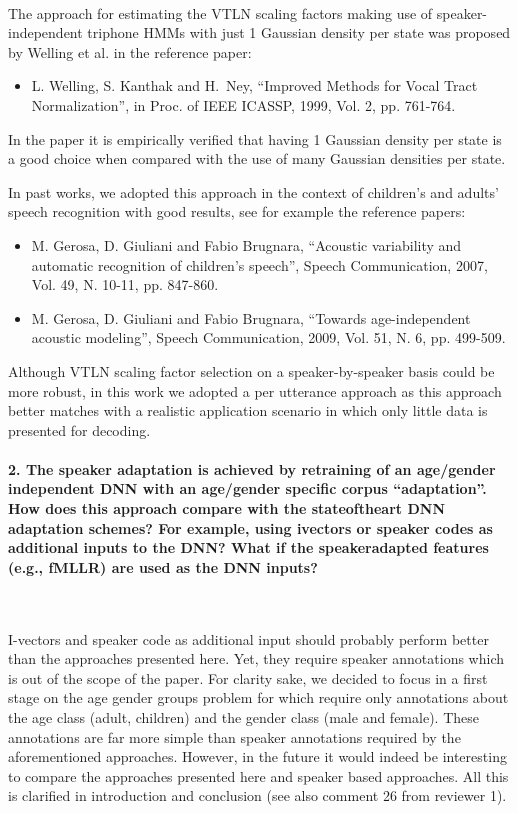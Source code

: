 \documentclass[]{article}
\begin{document}
~

The   approach  for  estimating   the  VTLN   scaling factors  making   use  of
speaker-independent  triphone  HMMs  with  just 1 Gaussian density  per  state  was
proposed by Welling et al. in the reference paper:
\begin{itemize}
\item L. Welling, S. Kanthak and  H.~Ney, ``Improved Methods for Vocal Tract                                              
Normalization'', in Proc. of IEEE ICASSP, 1999, Vol. 2, pp. 761-764.
\end{itemize}

In the paper it is empirically verified that having 1 Gaussian density
per state is a good  choice when compared
with the use of many Gaussian densities per state.

In past works, we  adopted this approach  in the context  of children's
and adults' speech recognition  with good results,  see for example  the reference
papers:

\begin{itemize}
\item M. Gerosa, D. Giuliani  and Fabio Brugnara, ``Acoustic variability and
automatic recognition of children's speech'', Speech Communication,
2007, Vol. 49, N. 10-11, pp. 847-860.
\item M. Gerosa, D. Giuliani and Fabio Brugnara, ``Towards age-independent acoustic modeling'',
Speech Communication, 2009, Vol. 51, N. 6, pp. 499-509.
\end{itemize}

Although VTLN scaling factor selection on a speaker-by-speaker basis
could be more robust, in this work we adopted a per utterance approach
as this approach better matches with a realistic application scenario
in which only little data is presented for decoding.


\paragraph{2. The speaker adaptation is achieved by retraining of an age/gender independent DNN with an age/gender specific corpus “adaptation”. How does this approach compare with the stateoftheart DNN adaptation schemes? For example, using ivectors or speaker codes as additional inputs to the DNN? What if the speakeradapted features (e.g., fMLLR) are used as the DNN inputs?}

~

I-vectors and speaker code as additional input should probably perform better than the approaches presented here. Yet, they require speaker annotations which is out of the scope of the paper. For clarity sake, we decided to focus in a first stage on the age gender groups problem for which require only annotations about the age class (adult, children) and the gender class (male and female). These annotations are far more simple than speaker annotations required by the aforementioned approaches. However, in the future it would indeed be interesting to compare the approaches presented here and speaker based approaches. All this is clarified in introduction and conclusion (see also comment 26 from reviewer 1).
\end{document}
